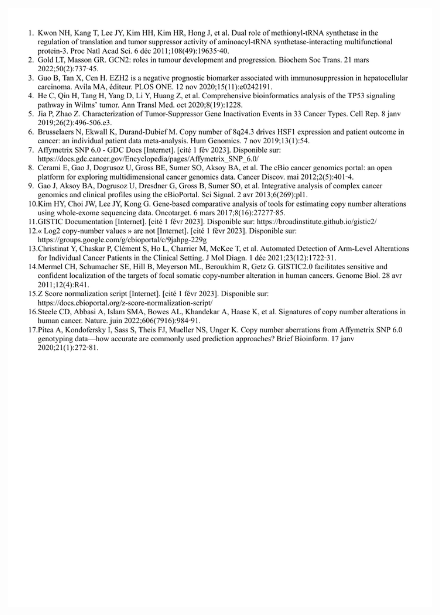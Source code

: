 \documentclass{style}
\begin{document}
\bibliographie
\begin{figure}[H]
    \centering
    \includegraphics[width=17cm]{images/figures/biblio.pdf}
\end{figure}

\annexes
\end{document}
